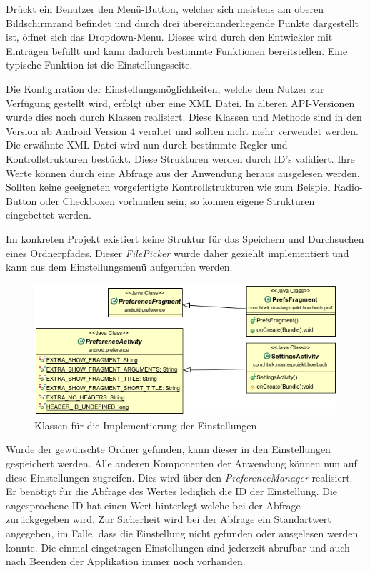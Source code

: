 Drückt ein Benutzer den Menü-Button, welcher sich meistens am oberen Bildschirmrand befindet und durch drei übereinanderliegende Punkte dargestellt ist, öffnet sich das Dropdown-Menu. Dieses wird durch den Entwickler mit Einträgen befüllt und kann dadurch bestimmte Funktionen bereitstellen. Eine typische Funktion ist die Einstellungsseite.

Die Konfiguration der Einstellungsmöglichkeiten, welche dem Nutzer zur Verfügung gestellt wird, erfolgt über eine XML Datei. In älteren API-Versionen wurde dies noch durch Klassen realisiert. Diese Klassen und Methode sind in den Version ab Android Version 4 veraltet und sollten nicht mehr verwendet werden. Die erwähnte XML-Datei wird nun durch bestimmte Regler und Kontrollstrukturen bestückt. Diese Strukturen werden durch ID's validiert. Ihre Werte können durch eine Abfrage aus der Anwendung heraus ausgelesen werden. Sollten keine geeigneten vorgefertigte Kontrollstrukturen wie zum Beispiel Radio-Button oder Checkboxen vorhanden sein, so können eigene Strukturen eingebettet werden.

Im konkreten Projekt existiert keine Struktur für das Speichern und Durchsuchen eines Ordnerpfades. Dieser \textit{FilePicker} wurde daher geziehlt implementiert und kann aus dem Einstellungsmenü aufgerufen werden.

\begin{center}
\begin{figure}
\includegraphics[scale=0.7]{images/settings}
\caption{Klassen für die Implementierung der Einstellungen}
\label{settings}
\end{figure}
\end{center}

Wurde der gewünschte Ordner gefunden, kann dieser in den Einstellungen gespeichert werden. Alle anderen Komponenten der Anwendung können nun auf diese Einstellungen zugreifen. Dies wird über den \textit{PreferenceManager} realisiert. Er benötigt für die Abfrage des Wertes lediglich die ID der Einstellung. Die angesprochene ID hat einen Wert hinterlegt welche bei der Abfrage zurückgegeben wird. Zur Sicherheit wird bei der Abfrage ein Standartwert angegeben, im Falle, dass die Einstellung nicht gefunden oder ausgelesen werden konnte. Die einmal eingetragen Einstellungen sind jederzeit abrufbar und auch nach Beenden der Applikation immer noch vorhanden.

